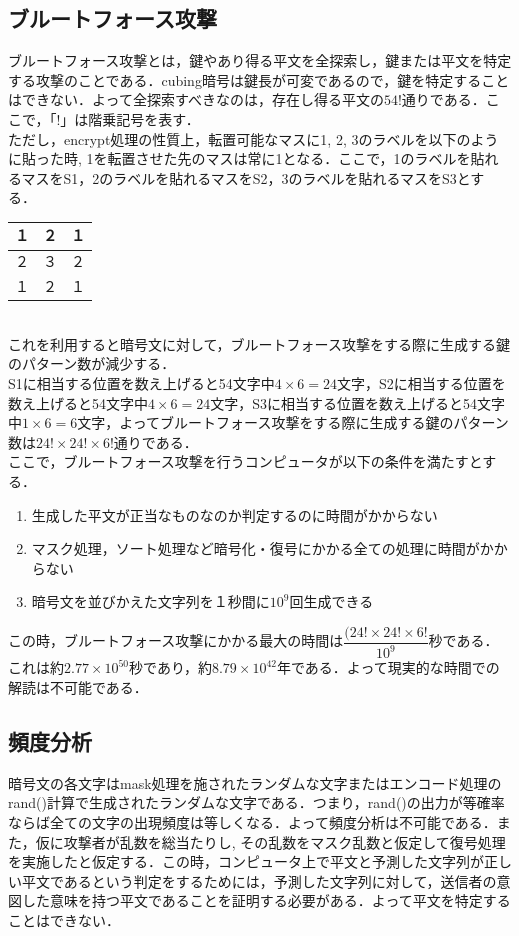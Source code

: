 \documentclass[titlepage]{jarticle}
\begin{document}
\subsection{ブルートフォース攻撃}
ブルートフォース攻撃とは，鍵やあり得る平文を全探索し，鍵または平文を特定する攻撃のことである．cubing暗号は鍵長が可変であるので，鍵を特定することはできない．よって全探索すべきなのは，存在し得る平文の\(54!\)通りである．ここで，「\(!\)」は階乗記号を表す．\\
ただし，encrypt処理の性質上，転置可能なマスに1, 2, 3のラベルを以下のように貼った時, 1を転置させた先のマスは常に1となる．ここで，1のラベルを貼れるマスをS1，2のラベルを貼れるマスをS2，3のラベルを貼れるマスをS3とする．
\begin{table}[htb]
  \centering
  \begin{tabular}{|l|c|r|} \hline
    １ & ２ & １ \\ \hline
    ２ & ３ & ２ \\ \hline
    １ & ２ & １ \\ \hline
  \end{tabular}
\end{table}\\
これを利用すると暗号文に対して，ブルートフォース攻撃をする際に生成する鍵のパターン数が減少する．\\
S1に相当する位置を数え上げると54文字中\(4\times6=24\)文字，S2に相当する位置を数え上げると54文字中\(4\times6=24\)文字，S3に相当する位置を数え上げると54文字中\(1\times6=6\)文字，よってブルートフォース攻撃をする際に生成する鍵のパターン数は\(24!\times24!\times6!\)通りである．\\
ここで，ブルートフォース攻撃を行うコンピュータが以下の条件を満たすとする．
\begin{enumerate}
  \item 生成した平文が正当なものなのか判定するのに時間がかからない
  \item マスク処理，ソート処理など暗号化・復号にかかる全ての処理に時間がかからない
  \item 暗号文を並びかえた文字列を１秒間に\(10^9\)回生成できる
\end{enumerate}
この時，ブルートフォース攻撃にかかる最大の時間は\(\dfrac{(24! \times 24! \times 6!}{10^9}\)秒である．\\
これは約\(2.77\times10^{50}\)秒であり，約\(8.79\times10^{42}\)年である．よって現実的な時間での解読は不可能である．

\subsection{頻度分析}
暗号文の各文字はmask処理を施されたランダムな文字またはエンコード処理のrand()計算で生成されたランダムな文字である．つまり，rand()の出力が等確率ならば全ての文字の出現頻度は等しくなる．よって頻度分析は不可能である．また，仮に攻撃者が乱数を総当たりし, その乱数をマスク乱数と仮定して復号処理を実施したと仮定する．この時，コンピュータ上で平文と予測した文字列が正しい平文であるという判定をするためには，予測した文字列に対して，送信者の意図した意味を持つ平文であることを証明する必要がある．よって平文を特定することはできない．
\end{document}

